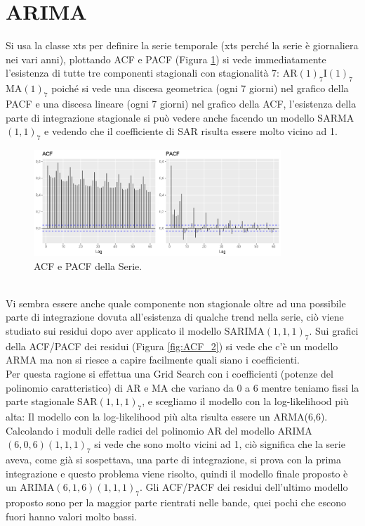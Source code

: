 \documentclass[12pt, onecolumn]{article}
\begin{document}
\section*{ARIMA}
Si usa la classe xts per definire la serie temporale (xts perché la serie è giornaliera nei vari anni), plottando ACF e PACF (Figura \ref{fig:ACF_1}) si vede immediatamente l'esistenza di tutte tre componenti stagionali con stagionalità 7: AR$(1)_7$I$(1)_7$MA$(1)_7$ poiché si vede una discesa geometrica (ogni 7 giorni) nel grafico della PACF e una discesa lineare (ogni 7 giorni) nel grafico della ACF, l'esistenza della parte di integrazione stagionale si può vedere anche facendo un modello SARMA$(1,1)_7$ e vedendo che il coefficiente di SAR risulta essere molto vicino ad 1. 
\begin{figure}[!h]
  \centering
  \includegraphics[width=\linewidth,height=4cm]{imgs/ACF_1.png}
  \caption{ACF e PACF della Serie.}
  \label{fig:ACF_1}
\end{figure}\\
Vi sembra essere anche quale componente non stagionale oltre ad una possibile parte di integrazione dovuta all'esistenza di qualche trend nella serie, ciò viene studiato sui residui dopo aver applicato il modello SARIMA$(1,1,1)_7$.
Sui grafici della ACF/PACF dei residui (Figura \ref{fig:ACF_2}) si vede che c'è un modello ARMA ma non si riesce a capire facilmente quali siano i coefficienti.\\
Per questa ragione si effettua una Grid Search con i coefficienti (potenze del polinomio caratteristico) di AR e MA che variano da 0 a 6 mentre teniamo fissi la parte stagionale SAR$(1,1,1)_7$, e scegliamo il modello con la log-likelihood più alta: Il modello con la log-likelihood più alta risulta essere un ARMA(6,6). Calcolando i moduli delle radici del polinomio AR del modello ARIMA$(6,0,6)(1,1,1)_7$ si vede che sono molto vicini ad 1, ciò significa che la serie aveva, come già si sospettava,  una parte di integrazione, si prova con la prima integrazione e questo problema viene risolto, quindi il modello finale proposto è un ARIMA$(6,1,6)(1,1,1)_7$. Gli ACF/PACF dei residui dell'ultimo modello proposto sono per la maggior parte rientrati nelle bande, quei pochi che escono fuori hanno valori molto bassi. \\
\end{document}
